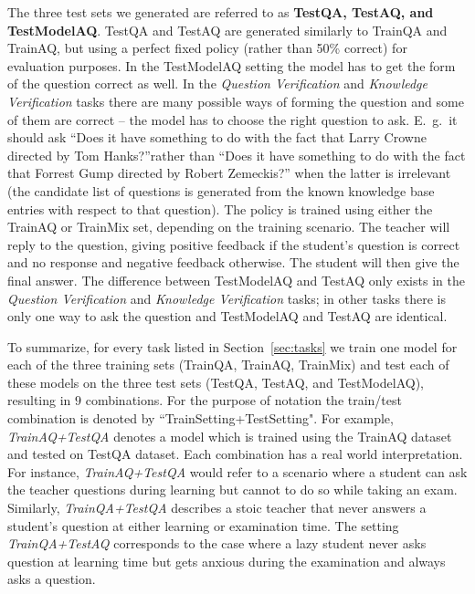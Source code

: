 The three test sets we generated are referred to as {\bf TestQA, TestAQ,
and TestModelAQ}. TestQA and TestAQ are generated similarly to TrainQA and TrainAQ,
but using a perfect fixed policy (rather than 50\% correct) for evaluation purposes.
In the TestModelAQ setting the model has to get the form of the question correct as well. 
In the  {\em Question Verification} and {\em Knowledge Verification} tasks there are many possible ways of forming the question and some of them are correct -- the model has to choose the right question to ask. E.\ g.\ it should ask ``Does it have something to do with the fact that Larry Crowne directed by Tom Hanks?''rather than ``Does it have something to do with the fact that Forrest Gump directed by Robert Zemeckis?'' when the latter is irrelevant (the candidate list of questions is generated from the known knowledge base entries with respect to that question).
The policy is trained
using either the TrainAQ or TrainMix set, depending on the training
scenario. The teacher will reply to the question, giving positive feedback
if the student's question is correct and no response and negative feedback otherwise. The
student will then give the final answer.
The difference between TestModelAQ and TestAQ only exists in
the {\it Question Verification} and {\it Knowledge Verification} tasks;
in other tasks there is only one way to ask the question
 and TestModelAQ and TestAQ are identical.

To summarize, for every task listed in Section~\ref{sec:tasks} we train
one model for each of the three training sets (TrainQA, TrainAQ, TrainMix)
and test each of these models on the three test sets (TestQA, TestAQ, and
TestModelAQ), resulting in $9$ combinations.
For the purpose of notation the train/test combination is denoted by
``TrainSetting+TestSetting". For example, {\it TrainAQ+TestQA} denotes
a model which is trained using the TrainAQ dataset and tested on TestQA
dataset. Each combination has a real world interpretation.  For instance,
{\it TrainAQ+TestQA} would refer to a scenario where a student can ask
the teacher questions during learning but cannot to do so while taking an
exam. Similarly, {\it TrainQA+TestQA} describes a stoic teacher that
never answers a student's question at either learning or examination time.
The setting {\it TrainQA+TestAQ} corresponds to the case where a lazy
student never asks question at learning time but gets anxious during the
examination and always asks a question.

